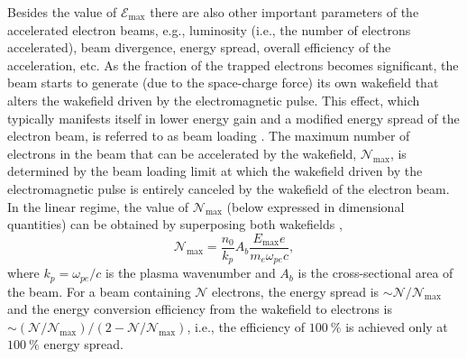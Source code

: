 \documentclass[10pt, a4paper, twoside, openright]{report}
\begin{document}
Besides the value of $ \mathcal{E}_{\mathrm{max}} $ there are also other important parameters of the accelerated electron beams, e.g., luminosity (i.e., the number of electrons accelerated), beam divergence, energy spread, overall efficiency of the acceleration, etc. As the fraction of the trapped electrons becomes significant, the beam starts to generate (due to the space-charge force) its own wakefield that alters the wakefield driven by the electromagnetic pulse. This effect, which typically manifests itself in lower energy gain and a modified energy spread of the electron beam, is referred to as beam loading \cite{Katsouleas1987, Tzoufras2008, Tzoufras2009}. The maximum number of electrons in the beam that can be accelerated by the wakefield, $ \mathcal{N}_{\mathrm{max}} $, is determined by the beam loading limit at which the wakefield driven by the electromagnetic pulse is entirely canceled by the wakefield of the electron beam. In the linear regime, the value of $ \mathcal{N}_{\mathrm{max}} $ (below expressed in dimensional quantities) can be obtained by superposing both wakefields \cite{Katsouleas1987},
\begin{equation}\label{eq:beam_loading}
	 \mathcal{N}_{\mathrm{max}} = \frac{n_0}{k_p} A_{b} \frac{E_{\mathrm{max}} e}{m_e \omega_{pe} c},
\end{equation}
where $ k_p = \omega_{pe} / c $ is the plasma wavenumber and $ A_b $ is the cross-sectional area of the beam. For a beam containing $ \mathcal{N} $ electrons, the energy spread is $ \sim \mathcal{N} / \mathcal{N}_{\mathrm{max}} $ and the energy conversion efficiency from the wakefield to electrons is $ \sim \left( \mathcal{N} / \mathcal{N}_{\mathrm{max}} \right) / \left( 2 - \mathcal{N} / \mathcal{N}_{\mathrm{max}} \right) $, i.e., the efficiency of $ 100 \ \% $ is achieved only at $ 100 \ \% $ energy spread.


%

%

%
\end{document}
